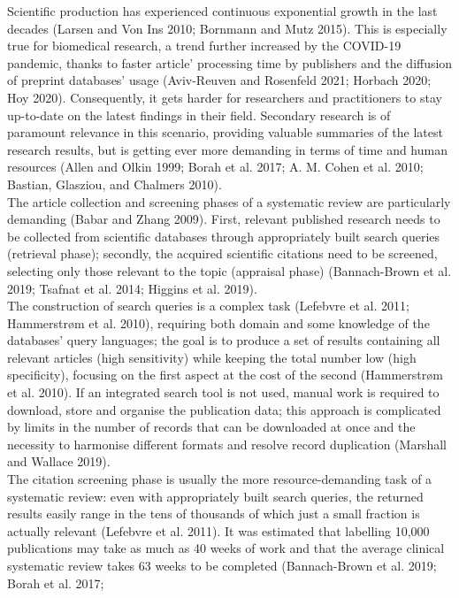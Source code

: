 \documentclass{article}
\begin{document}
Scientific production has experienced continuous exponential growth in
the last decades (Larsen and Von Ins 2010; Bornmann and Mutz 2015). This
is especially true for biomedical research, a trend further increased by
the COVID-19 pandemic, thanks to faster article' processing time by
publishers and the diffusion of preprint databases' usage (Aviv-Reuven
and Rosenfeld 2021; Horbach 2020; Hoy 2020). Consequently, it gets
harder for researchers and practitioners to stay up-to-date on the
latest findings in their field. Secondary research is of paramount
relevance in this scenario, providing valuable summaries of the latest
research results, but is getting ever more demanding in terms of time
and human resources (Allen and Olkin 1999; Borah et al. 2017; A. M.
Cohen et al. 2010; Bastian, Glasziou, and Chalmers 2010).\\
The article collection and screening phases of a systematic review are
particularly demanding (Babar and Zhang 2009). First, relevant published
research needs to be collected from scientific databases through
appropriately built search queries (retrieval phase); secondly, the
acquired scientific citations need to be screened, selecting only those
relevant to the topic (appraisal phase) (Bannach-Brown et al. 2019;
Tsafnat et al. 2014; Higgins et al. 2019).\\
The construction of search queries is a complex task (Lefebvre et al.
2011; Hammerstrøm et al. 2010), requiring both domain and some knowledge
of the databases' query languages; the goal is to produce a set of
results containing all relevant articles (high sensitivity) while
keeping the total number low (high specificity), focusing on the first
aspect at the cost of the second (Hammerstrøm et al. 2010). If an
integrated search tool is not used, manual work is required to download,
store and organise the publication data; this approach is complicated by
limits in the number of records that can be downloaded at once and the
necessity to harmonise different formats and resolve record duplication
(Marshall and Wallace 2019).\\
The citation screening phase is usually the more resource-demanding task
of a systematic review: even with appropriately built search queries,
the returned results easily range in the tens of thousands of which just
a small fraction is actually relevant (Lefebvre et al. 2011). It was
estimated that labelling 10,000 publications may take as much as 40
weeks of work and that the average clinical systematic review takes 63
weeks to be completed (Bannach-Brown et al. 2019; Borah et al. 2017;
\end{document}
